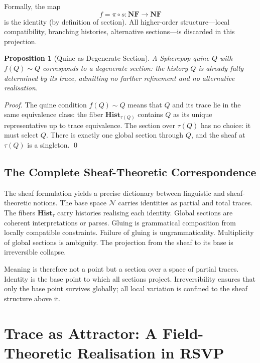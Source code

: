 \documentclass[12pt, oneside]{amsbook}
\theoremstyle{plain}
\newtheorem{proposition}[theorem]{Proposition}
\theoremstyle{definition}
\theoremstyle{remark}
\newcommand{\NF}{\mathcal{N}}
\newcommand{\evalf}{f}
\newcommand{\trace}{\tau}
\newcommand{\tequiv}{\sim}
\begin{document}
Formally, the map
\[
  \evalf = \pi \circ s : \mathbf{NF} \to \mathbf{NF}
\]
is the identity (by definition of section). All higher-order structure---local
compatibility, branching histories, alternative sections---is discarded in
this projection.

\begin{proposition}[Quine as Degenerate Section]
\label{prop:quine-section}
A Spherepop quine $Q$ with $\evalf(Q) \tequiv Q$ corresponds to a degenerate
section: the history $Q$ is already fully determined by its trace, admitting
no further refinement and no alternative realisation.
\end{proposition}

\begin{proof}
The quine condition $\evalf(Q) \tequiv Q$ means that $Q$ and its trace lie
in the same equivalence class: the fiber $\mathbf{Hist}_{\trace(Q)}$ contains
$Q$ as its unique representative up to trace equivalence. The section over
$\trace(Q)$ has no choice: it must select $Q$. There is exactly one global
section through $Q$, and the sheaf at $\trace(Q)$ is a singleton. \qed
\end{proof}

\section{The Complete Sheaf-Theoretic Correspondence}

The sheaf formulation yields a precise dictionary between linguistic and
sheaf-theoretic notions. The base space $\NF$ carries identities as partial
and total traces. The fibers $\mathbf{Hist}_\tau$ carry histories realising
each identity. Global sections are coherent interpretations or parses. Gluing
is grammatical composition from locally compatible constraints. Failure of
gluing is ungrammaticality. Multiplicity of global sections is ambiguity.
The projection from the sheaf to its base is irreversible collapse.

Meaning is therefore not a point but a section over a space of partial traces.
Identity is the base point to which all sections project. Irreversibility
ensures that only the base point survives globally; all local variation is
confined to the sheaf structure above it.

\chapter{Trace as Attractor: A Field-Theoretic Realisation in RSVP}
\label{app:rsvp}
\end{document}
